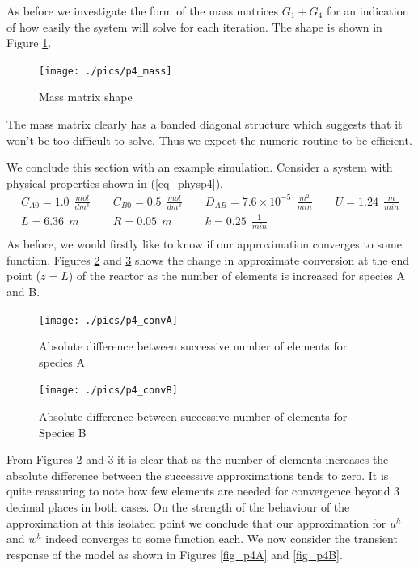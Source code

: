 \documentclass[11pt,fleqn]{article}
\theoremstyle{defstyle}
\begin{document}
As before we investigate the form of the mass matrices $G_1 + G_4$ for an indication of how easily the system will solve for each iteration. The shape is shown in Figure \ref{fig_p4mass}.
\begin{figure}[H] 
\centering
\texttt{[image: ./pics/p4\_mass]}
\caption{Mass matrix shape} 
\label{fig_p4mass}
\end{figure}
The mass matrix clearly has a banded diagonal structure which suggests that it won't be too difficult to solve. Thus we expect the numeric routine to be efficient. 

We conclude this section with an example simulation. Consider a system with physical properties shown in (\ref{eq_physp4}).
\begin{equation}
\begin{matrix}
C_{A0} = 1.0 ~~ \frac{mol}{dm^3}& \phantom{-}C_{B0} = 0.5~~ \frac{mol}{dm^3} & \phantom{-}D_{AB} = 7.6\times 10^{-5} ~~\frac{m^2}{min} & \phantom{-}U = 1.24~~ \frac{m}{min} \\
L = 6.36~~ m 
& \phantom{-} R = 0.05~~ m
& \phantom{-} k = 0.25 ~~ \frac{1}{min} \\
\end{matrix} 
\label{eq_physp4}
\end{equation}
As before, we would firstly like to know if our approximation converges to some function. Figures \ref{fig_p4convA} and \ref{fig_p4convB} shows the change in approximate conversion at the end point ($z=L$) of the reactor as the number of elements is increased for species A and B.
\begin{figure}[H] 
\centering
\texttt{[image: ./pics/p4\_convA]}
\caption{Absolute difference between successive number of elements for species A} 
\label{fig_p4convA}
\end{figure}
\begin{figure}[H] 
\centering
\texttt{[image: ./pics/p4\_convB]}
\caption{Absolute difference between successive number of elements for Species B} 
\label{fig_p4convB}
\end{figure}
From Figures \ref{fig_p4convA} and \ref{fig_p4convB} it is clear that as the number of elements increases the absolute difference between the successive approximations tends to zero. It is quite reassuring to note how few elements are needed for convergence beyond 3 decimal places in both cases. On the strength of the behaviour of the approximation at this isolated point we conclude that our approximation for $u^h$ and $w^h$ indeed converges to some function each. We now consider the transient response of the model as shown in Figures \ref{fig_p4A} and \ref{fig_p4B}.
\end{document}
